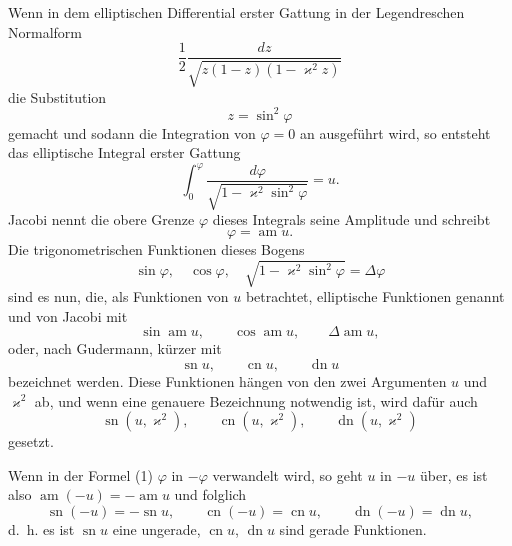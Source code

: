 \documentclass[11pt]{article}
\begin{document}
Wenn in dem elliptischen Differential erster Gattung in der Legendreschen Normalform
\[
\frac12\frac{dz}{\sqrt{z(1-z)(1-\varkappa^2z)}}
\]
die Substitution
\begin{equation}
z=\sin^2\varphi
\tag{1}
\end{equation}
gemacht und sodann die Integration von $\varphi=0$ an ausgeführt wird, so entsteht das elliptische Integral erster Gattung
\begin{equation}
\int_0^\varphi\frac{d\varphi}{\sqrt{1-\varkappa^2\sin^2\varphi}}=u.
\tag{2}
\end{equation}
Jacobi nennt die obere Grenze $\varphi$ dieses Integrals seine Amplitude und schreibt
\begin{equation}
\varphi=\operatorname{am}u.
\tag{3}
\end{equation}
Die trigonometrischen Funktionen dieses Bogens
\begin{equation}
\sin\varphi,\quad \cos\varphi,\quad
\sqrt{1-\varkappa^2\sin^2\varphi}=\Delta\varphi
\tag{4}
\end{equation}
sind es nun, die, als Funktionen von $u$ betrachtet, elliptische Funktionen genannt und von Jacobi mit
\[
\sin\operatorname{am}u,\qquad \cos\operatorname{am}u,\qquad \Delta\operatorname{am}u,
\]
oder, nach Gudermann, kürzer mit
\begin{equation}
\operatorname{sn}u,\qquad \operatorname{cn}u,\qquad \operatorname{dn}u
\tag{5}
\end{equation}
bezeichnet werden. Diese Funktionen hängen von den zwei Argumenten $u$ und $\varkappa^2$ ab, und wenn eine genauere Bezeichnung notwendig ist, wird dafür auch
\[
\operatorname{sn}(u,\varkappa^2),\qquad
\operatorname{cn}(u,\varkappa^2),\qquad
\operatorname{dn}(u,\varkappa^2)
\]
gesetzt.

Wenn in der Formel (1) $\varphi$ in $-\varphi$ verwandelt wird, so geht $u$ in $-u$ über, es ist also $\operatorname{am}(-u)=-\operatorname{am}u$ und folglich
\[
\operatorname{sn}(-u)=-\operatorname{sn}u,\qquad
\operatorname{cn}(-u)=\operatorname{cn}u,\qquad
\operatorname{dn}(-u)=\operatorname{dn}u,
\]
d.~h. es ist $\operatorname{sn}u$ eine ungerade, $\operatorname{cn}u$, $\operatorname{dn}u$ sind gerade Funktionen.
\end{document}
